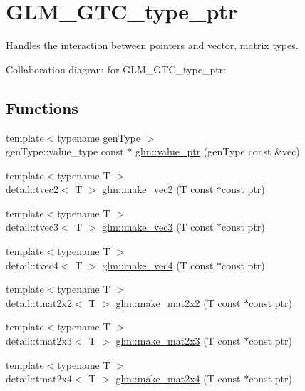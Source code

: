 \hypertarget{group__gtc__type__ptr}{}\section{G\+L\+M\+\_\+\+G\+T\+C\+\_\+type\+\_\+ptr}
\label{group__gtc__type__ptr}


Handles the interaction between pointers and vector, matrix types.  


Collaboration diagram for G\+L\+M\+\_\+\+G\+T\+C\+\_\+type\+\_\+ptr\+:
\subsection*{Functions}
\begin{DoxyCompactItemize}
\item 
{\footnotesize template$<$typename gen\+Type $>$ }\\gen\+Type\+::value\+\_\+type const $\ast$ \hyperlink{group__gtc__type__ptr_ga140f5c39d519780c61e02e47daa7d18a}{glm\+::value\+\_\+ptr} (gen\+Type const \&vec)
\item 
{\footnotesize template$<$typename T $>$ }\\detail\+::tvec2$<$ T $>$ \hyperlink{group__gtc__type__ptr_ga60e64ef452541f76f7b5b4e04b18062a}{glm\+::make\+\_\+vec2} (T const $\ast$const ptr)
\item 
{\footnotesize template$<$typename T $>$ }\\detail\+::tvec3$<$ T $>$ \hyperlink{group__gtc__type__ptr_ga0e2e7d24d80edb5a95a86c6a76ae5a41}{glm\+::make\+\_\+vec3} (T const $\ast$const ptr)
\item 
{\footnotesize template$<$typename T $>$ }\\detail\+::tvec4$<$ T $>$ \hyperlink{group__gtc__type__ptr_ga5d91c17941c35effc46b335ad6fb6252}{glm\+::make\+\_\+vec4} (T const $\ast$const ptr)
\item 
{\footnotesize template$<$typename T $>$ }\\detail\+::tmat2x2$<$ T $>$ \hyperlink{group__gtc__type__ptr_ga1d0007368a23e89e4a0efcda06c1fa27}{glm\+::make\+\_\+mat2x2} (T const $\ast$const ptr)
\item 
{\footnotesize template$<$typename T $>$ }\\detail\+::tmat2x3$<$ T $>$ \hyperlink{group__gtc__type__ptr_ga87d29f47fbd3990a344be2eac404aee3}{glm\+::make\+\_\+mat2x3} (T const $\ast$const ptr)
\item 
{\footnotesize template$<$typename T $>$ }\\detail\+::tmat2x4$<$ T $>$ \hyperlink{group__gtc__type__ptr_gaab3df4b27b38505f1413f507ebc43d18}{glm\+::make\+\_\+mat2x4} (T const $\ast$const ptr)

\end{DoxyCompactItemize}
